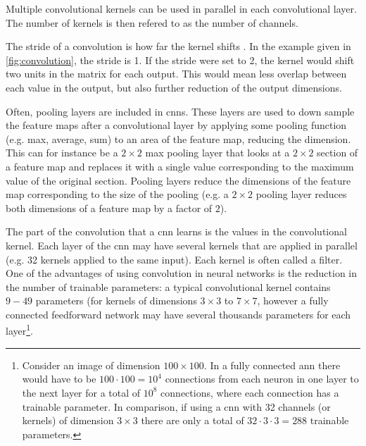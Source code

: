 Multiple convolutional kernels can be used in parallel in each convolutional layer. The number of kernels is then refered to as the number of channels. 

The stride of a convolution is how far the kernel shifts \cite{oshea2015introduction}. In the example given in \cref{fig:convolution}, the stride is 1. If the stride were set to 2, the kernel would shift two units in the matrix for each output. This would mean less overlap between each value in the output, but also further reduction of the output dimensions. 

Often, pooling layers are included in \acrshort{cnn}s. These layers are used to down sample the feature maps after a convolutional layer by applying some pooling function (e.g. max, average, sum) to an area of the feature map, reducing the dimension. This can for instance be a $2\times2$ max pooling layer that looks at a $2\times2$ section of a feature map and replaces it with a single value corresponding to the maximum value of the original section. Pooling layers reduce the dimensions of the feature map corresponding to the size of the pooling (e.g. a $2\times2$ pooling layer reduces both dimensions of a feature map by a factor of $2$). 

The part of the convolution that a \acrshort{cnn} learns is the values in the convolutional kernel. Each layer of the \acrshort{cnn} may have several kernels that are applied in parallel (e.g. 32 kernels applied to the same input). Each kernel is often called a filter. One of the advantages of using convolution in neural networks is the reduction in the number of trainable parameters: a typical convolutional kernel contains $9-49$ parameters (for kernels of dimensions $3\times3$ to $7\times7$, however a fully connected feedforward network may have several thousands parameters for each layer\footnote{Consider an image of dimension $100\times100$. In a fully connected \acrshort{ann} there would have to be $100 \cdot 100 = 10^4$ connections from each neuron in one layer to the next layer for a total of $10^{8}$ connections, where each connection has a trainable parameter. In comparison, if using a \acrshort{cnn} with 32 channels (or kernels) of dimension $3\times3$ there are only a total of $32 \cdot 3 \cdot 3 = 288$ trainable parameters. }. 

